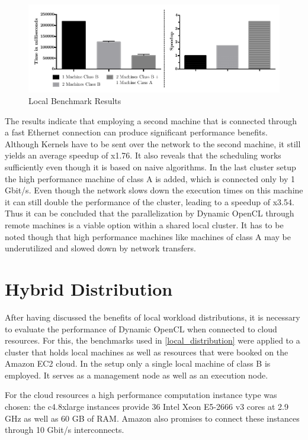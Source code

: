 \begin{figure}[H]
	
	\includegraphics[width=1.0\textwidth]{images/local_full_benchmark_results.pdf}
	\centering
	\caption{Local Benchmark Results}
	\label{img:local_benchmark_results}
\end{figure}

The results indicate that employing a second machine that is connected through a fast Ethernet connection can produce significant performance benefits. Although Kernels have to be sent over the network to the second machine, it still yields an average speedup of x1.76. It also reveals that the scheduling works sufficiently even though it is based on naive algorithms. In the last cluster setup the high performance machine of class A is added, which is connected only by 1 Gbit/s. Even though the network slows down the execution times on this machine it can still double the performance of the cluster, leading to a speedup of x3.54. Thus it can be concluded that the parallelization by Dynamic OpenCL through remote machines is a viable option within a shared local cluster. It has to be noted though that high performance machines like machines of class A may be underutilized and slowed down by network transfers.

\section{Hybrid Distribution}

After having discussed the benefits of local workload distributions, it is necessary to evaluate the performance of Dynamic OpenCL when connected to cloud resources. For this, the benchmarks used in \ref{local_distribution} were applied to a cluster that holds local machines as well as resources that were booked on the Amazon EC2 cloud. In the setup only a single local machine of class B is employed. It serves as a management node as well as an execution node. 

For the cloud resources a high performance computation instance type was chosen: the c4.8xlarge instances provide 36 Intel Xeon E5-2666 v3 cores at 2.9 GHz as well as 60 GB of RAM. Amazon also promises to connect these instances through 10 Gbit/s interconnects.

